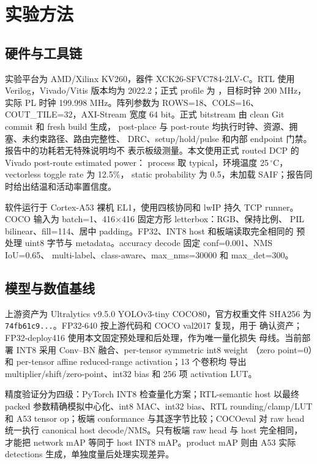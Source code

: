 \section{实验方法}
\label{sec:method}

\subsection{硬件与工具链}

实验平台为 AMD/Xilinx KV260，器件 XCK26-SFVC784-2LV-C。RTL 使用
Verilog，Vivado/Vitis 版本均为 2022.2；正式 profile 为
，目标时钟 200 MHz，实际 PL 时钟
199.998 MHz。阵列参数为 ROWS=18、COLS=16、COUT\_TILE=32，AXI-Stream
宽度 64 bit。正式 bitstream 由 clean Git commit 和 fresh build 生成，
post-place 与 post-route 均执行时钟、资源、拥塞、未约束路径、路由完整性、
DRC、setup/hold/pulse 和内部 endpoint 门禁。报告中的功耗若无特殊说明均不
表示板级测量。本文使用正式 routed DCP 的 Vivado post-route estimated power：
process 取 typical，环境温度 25\,$^\circ$C，vectorless toggle rate 为 12.5\%，
static probability 为 0.5，未加载 SAIF；报告同时给出结温和活动率置信度。

软件运行于 Cortex-A53 裸机 EL1，使用四核协同和 lwIP 持久 TCP runner。
COCO 输入为 batch=1、416$\times$416 固定方形 letterbox：RGB、保持比例、
PIL bilinear、fill=114、居中 padding。FP32、INT8 host 和板端读取完全相同的
预处理 uint8 字节与 metadata。accuracy decode 固定 conf=0.001、NMS IoU=0.65、
multi-label、class-aware、max\_nms=30000 和 max\_det=300。

\subsection{模型与数值基线}

上游资产为 Ultralytics v9.5.0 YOLOv3-tiny COCO80，官方权重文件 SHA256
为 \texttt{74fb61c9...}。FP32-640 按上游代码和 COCO val2017 复现，用于
确认资产；FP32-deploy416 使用本文固定预处理和后处理，作为唯一量化损失
母线。当前部署 INT8 采用 Conv--BN 融合、per-tensor symmetric int8 weight
（zero point=0）和 per-tensor affine reduced-range activation；13 个卷积均
导出 multiplier/shift/zero-point、int32 bias 和 256 项 activation LUT。

精度验证分为四级：PyTorch INT8 检查量化方案；RTL-semantic host 以最终
packed 参数精确模拟中心化、int8 MAC、int32 bias、RTL rounding/clamp/LUT
和 A53 tensor op；板端 conformance 与其逐字节比较；COCOeval 对 raw head
统一执行 canonical host decode/NMS。只有板端 raw head 与 host 完全相同，
才能把 network mAP 等同于 host INT8 mAP。product mAP 则由 A53 实际
detections 生成，单独度量后处理实现差异。

